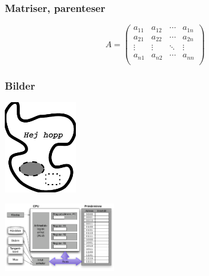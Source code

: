 \begin{frame}[fragile,t]
  \frametitle{Matriser, parenteser}
  \vspace{2em}

  \begin{exlatex}
\begin{displaymath}
A=\left(
\begin{array}{cccc}
a_{11} & a_{12} & \cdots & a_{1n} \\
a_{21} & a_{22} & \cdots & a_{2n} \\
\vdots & \vdots & \ddots & \vdots \\
a_{n1} & a_{n2} & \cdots & a_{nn} \\
\end{array}
\right)
\end{displaymath}
  \end{exlatex}
\end{frame}


\begin{frame}[fragile,t]
  \frametitle{Bilder}
  \vspace{2em}



  \blankline

  \vspace{2mm}
  \begin{exsrc}
\includegraphics[height=40mm]
    {images/bild.pdf}
  \end{exsrc}
  \begin{exresult}
\includegraphics[height=30mm]{images/enkelmodell.pdf}
  \end{exresult}

\end{frame}

